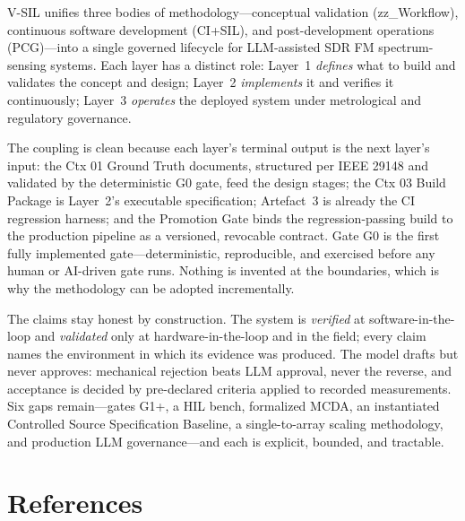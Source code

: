 \documentclass[11pt,a4paper]{article}
\newcommand{\verified}{\emph{verified}}
\newcommand{\validated}{\emph{validated}}
\begin{document}
V-SIL unifies three bodies of methodology---conceptual validation (zz\_Workflow), continuous
software development (CI+SIL), and post-development operations (PCG)---into a single governed
lifecycle for LLM-assisted SDR FM spectrum-sensing systems. Each layer has a distinct role:
Layer~1 \emph{defines} what to build and validates the concept and design; Layer~2
\emph{implements} it and verifies it continuously; Layer~3 \emph{operates} the deployed system
under metrological and regulatory governance.

The coupling is clean because each layer's terminal output is the next layer's input: the Ctx 01
Ground Truth documents, structured per IEEE 29148 and validated by the deterministic G0 gate,
feed the design stages; the Ctx 03 Build Package is Layer~2's executable specification;
Artefact~3 is already the CI regression harness; and the Promotion Gate binds the
regression-passing build to the production pipeline as a versioned, revocable contract. Gate G0
is the first fully implemented gate---deterministic, reproducible, and exercised before any
human or AI-driven gate runs. Nothing is invented at the boundaries, which is why the
methodology can be adopted incrementally.

The claims stay honest by construction. The system is \verified{} at software-in-the-loop and
\validated{} only at hardware-in-the-loop and in the field; every claim names the environment in
which its evidence was produced. The model drafts but never approves: mechanical rejection beats
LLM approval, never the reverse, and acceptance is decided by pre-declared criteria applied to
recorded measurements. Six gaps remain---gates G1+, a HIL bench, formalized MCDA, an instantiated Controlled
Source Specification Baseline, a single-to-array scaling methodology, and production LLM
governance---and each is explicit, bounded, and tractable.

\appendix
\section*{References}
\label{sec:references}
\end{document}

